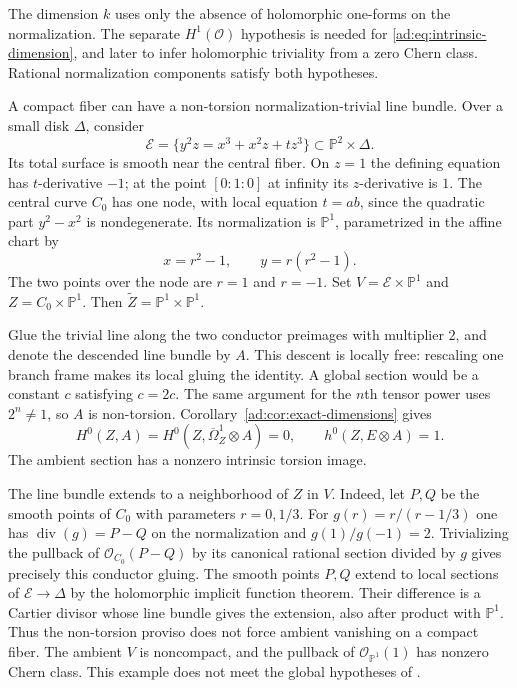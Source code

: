 \documentclass[11pt]{article}
\numberwithin{equation}{section}
\begin{document}
The dimension $k$ uses only the absence of holomorphic one-forms
on the normalization. The separate $H^1(\mathcal O)$ hypothesis
is needed for \eqref{ad:eq:intrinsic-dimension}, and later to infer
holomorphic triviality from a zero Chern class. Rational
normalization components satisfy both hypotheses.

\begin{example}\label{ad:ex:nodal-nontorsion}
A compact fiber can have a non-torsion normalization-trivial line
bundle. Over a small disk $\Delta$, consider
\[
 \mathcal E=\{y^2z=x^3+x^2z+t z^3\}\subset\mathbb P^2\times\Delta.
\]
Its total surface is smooth near the central fiber. On $z=1$ the
defining equation has $t$-derivative $-1$; at the point
$[0:1:0]$ at infinity its $z$-derivative is $1$.
The central curve $C_0$ has one node, with local equation $t=ab$,
since the quadratic part $y^2-x^2$ is nondegenerate.
Its normalization is $\mathbb P^1$, parametrized in the affine
chart by
\[
 x=r^2-1,\qquad y=r(r^2-1).
\]
The two points over the node are $r=1$ and $r=-1$.
Set $V=\mathcal E\times\mathbb P^1$ and
$Z=C_0\times\mathbb P^1$. Then
$\widetilde Z=\mathbb P^1\times\mathbb P^1$.

Glue the trivial line along the two conductor preimages with
multiplier $2$, and denote the descended line bundle by $A$.
This descent is locally free: rescaling one branch frame makes
its local gluing the identity. A global section would be a
constant $c$ satisfying $c=2c$. The same argument for the
$n$th tensor power uses $2^n\ne1$, so $A$ is non-torsion.
Corollary~\ref{ad:cor:exact-dimensions} gives
\[
 H^0(Z,A)=H^0(Z,\overline\Omega_Z^1\otimes A)=0,
 \qquad h^0(Z,E\otimes A)=1.
\]
The ambient section has a nonzero intrinsic torsion image.

The line bundle extends to a neighborhood of $Z$ in $V$.
Indeed, let $P,Q$ be the smooth points of $C_0$ with parameters
$r=0,1/3$. For $g(r)=r/(r-1/3)$ one has
$\operatorname{div}(g)=P-Q$ on the normalization and
$g(1)/g(-1)=2$. Trivializing the pullback of
$\mathcal O_{C_0}(P-Q)$ by its canonical rational section divided
by $g$ gives precisely this conductor gluing.
The smooth points $P,Q$ extend to local sections of
$\mathcal E\to\Delta$ by the holomorphic implicit function theorem.
Their difference is a Cartier divisor whose line bundle gives the
extension, also after product with $\mathbb P^1$.
Thus the non-torsion proviso does not force ambient vanishing on
a compact fiber. The ambient $V$ is noncompact, and the pullback
of $\mathcal O_{\mathbb P^1}(1)$ has nonzero Chern class. This
example does not meet the global hypotheses of
\cite[Theorem~2.2]{CDP2020}.
\end{example}
\end{document}
